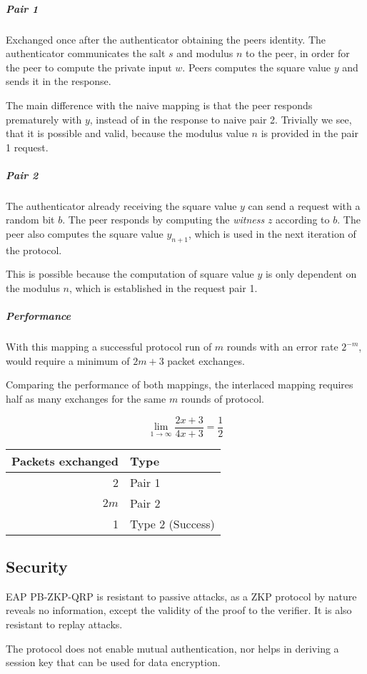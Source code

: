 \subparagraph{Pair 1} Exchanged once after the authenticator obtaining the peers identity. The authenticator communicates the salt $s$ and modulus $n$ to the peer, in order for the peer to compute the private input $w$. 
Peers computes the square value $y$ and sends it in the response.

The main difference with the naive mapping is that the peer responds prematurely with $y$, instead of in the response to naive pair 2. %
Trivially we see, that it is possible and valid, because the modulus value $n$ is provided in the pair 1 request.

\subparagraph{Pair 2}
The authenticator already receiving the square value $y$ can send a request with a random bit $b$. The peer responds by computing the \textit{witness} $z$ according to $b$.
The peer also computes the square value $y_{n+1}$, which is used in the next iteration of the protocol.

This is possible because the computation of square value $y$ is only dependent on the modulus $n$, which is established in the request pair 1.

\subparagraph{Performance}
With this mapping a successful protocol run of $m$ rounds with an error rate $2^{-m}$, would require a minimum of $2m + 3$ packet exchanges.

Comparing the performance of both mappings, the interlaced mapping requires half as many exchanges for the same $m$ rounds of protocol.

$$\lim_{1 \rightarrow \infty} \frac{2x + 3}{4x + 3} = \frac{1}{2}$$

\bigskip

\begin{tabular}{r|l}
	Packets exchanged & Type\\
	\hline
	2 & Pair 1\\
	$2m$ & Pair 2\\
	1 & Type 2 (Success)\\
\end{tabular}

\subsection{Security}
EAP PB-ZKP-QRP is resistant to passive attacks, as a ZKP protocol by nature reveals no information, except the validity of the proof to the verifier.
It is also resistant to replay attacks.

The protocol does not enable mutual authentication, nor helps in deriving a session key that can be used for data encryption.


